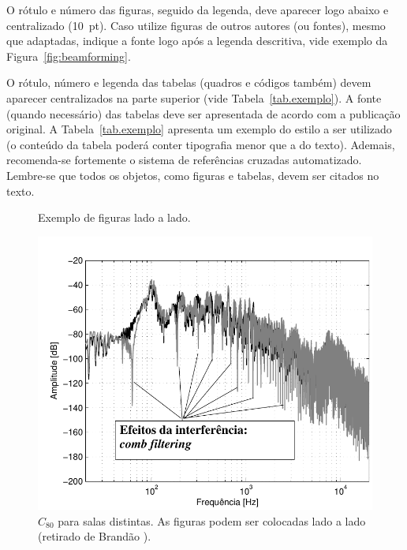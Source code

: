 \documentclass[12pt, a4paper, twoside, twocolumn]{article}
\begin{document}
O rótulo e número das figuras, seguido da legenda, deve aparecer logo abaixo e centralizado (10~pt). Caso utilize figuras de outros autores (ou fontes), mesmo que adaptadas, indique a fonte logo após a legenda descritiva, vide exemplo da Figura~\ref{fig:beamforming}.

O rótulo, número e legenda das tabelas (quadros e códigos também) devem aparecer centralizados na parte superior (vide Tabela~\ref{tab.exemplo}). A fonte (quando necessário) das tabelas deve ser apresentada de acordo com a publicação original. A Tabela~\ref{tab.exemplo} apresenta um exemplo do estilo a ser utilizado (o conteúdo da tabela poderá conter tipografia menor que a do texto). Ademais, recomenda-se fortemente o sistema de referências cruzadas automatizado. Lembre-se que todos os objetos, como figuras e tabelas, devem ser citados no texto.

\begin{figure}[H]
  \centering
	\qquad
  \caption{Exemplo de figuras lado a lado.}
  \label{subfig.exemplo}
\end{figure}

\begin{figure}[ht!]
	\centering \vspace{-3mm}
        \includegraphics[width=0.98\linewidth,page=1]{figs/Combfilter-Brandao-2017.pdf}
        \caption{$C_{80}$ para salas distintas. As figuras podem ser colocadas lado a lado (retirado de Brandão \cite{Brandao-2017}).}
	\label{fig:C80}%
\end{figure}
\end{document}
